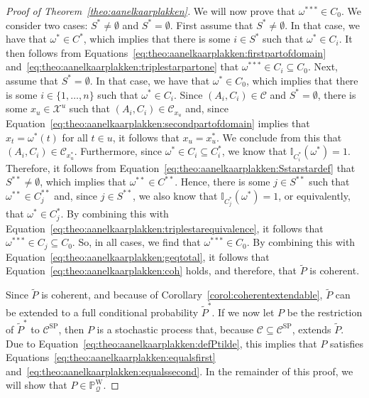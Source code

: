 \documentclass[10pt,a4paper]{paper}
\theoremstyle{definition}
\newcommand{\states}{\mathcal{X}}
\newcommand{\processes}{\mathbb{P}}
\newcommand{\wprocesses}{\processes^{\mathrm{W}}}
\newcommand{\ind}[1]{\mathbb{I}_{#1}}
\newcommand{\rateset}{\mathcal{Q}}
\begin{document}
\begin{proof}[Proof of Theorem~\ref{theo:aanelkaarplakken}]
We will now prove that $\omega^{***}\in C_0$. We consider two cases: $S^*\neq\emptyset$ and $S^*=\emptyset$. First assume that $S^*\neq\emptyset$. In that case, we have that $\omega^*\in C^*$, which implies that there is some $i\in S^*$ such that $\omega^*\in C_i$. It then follows from Equations~\eqref{eq:theo:aanelkaarplakken:firstpartofdomain} and~\eqref{eq:theo:aanelkaarplakken:triplestarpartone} that $\omega^{***}\in C_i\subseteq C_0$. 
Next, assume that $S^*=\emptyset$. In that case, we have that $\omega^*\in C_0$, which implies that there is some $i\in\{1,\dots,n\}$ such that $\omega^*\in C_i$. Since $(A_i,C_i)\in\mathcal{C}$ and $S^*=\emptyset$, there is some $x_u\in\states^u$ such that $(A_i,C_i)\in\mathcal{C}_{x_u}$ and, since Equation~\eqref{eq:theo:aanelkaarplakken:secondpartofdomain} implies that $x_t=\omega^*(t)$ for all $t\in u$, it follows that $x_u=x_u^*$. We conclude from this that $(A_i,C_i)\in\mathcal{C}_{x_u^*}$. Furthermore, since $\omega^*\in C_i\subseteq C_i^*$, we know that $\ind{C_i^*}(\omega^*)=1$. Therefore, it follows from Equation~\eqref{eq:theo:aanelkaarplakken:Sstarstardef} that $S^{**}\neq\emptyset$, which implies that $\omega^{**}\in C^{**}$. Hence, there is some $j\in S^{**}$ such that $\omega^{**}\in C_j^{**}$ and, since $j\in S^{**}$, we also know that $\ind{C_j^*}(\omega^*)=1$, or equivalently, that $\omega^*\in C_j^*$. By combining this with Equation~\eqref{eq:theo:aanelkaarplakken:triplestarequivalence}, it follows that $\omega^{***}\in C_j\subseteq C_0$.
So, in all cases, we find that $\omega^{***}\in C_0$. By combining this with Equation~\eqref{eq:theo:aanelkaarplakken:geqtotal}, it follows that Equation~\eqref{eq:theo:aanelkaarplakken:coh} holds, and therefore, that $\tilde{P}$ is coherent.


Since $\tilde{P}$ is coherent, and because of Corollary~\ref{corol:coherentextendable}, $\tilde{P}$ can be extended to a full conditional probability $\tilde{P}^*$. If we now let $P$ be the restriction of $\tilde{P}^*$ to $\mathcal{C}^\mathrm{SP}$, then $P$ is a stochastic process that, because $\mathcal{C}\subseteq\mathcal{C}^\mathrm{SP}$, extends $\tilde{P}$. Due to Equation~\eqref{eq:theo:aanelkaarplakken:defPtilde}, this implies that $P$ satisfies Equations~\eqref{eq:theo:aanelkaarplakken:equalsfirst} and~\eqref{eq:theo:aanelkaarplakken:equalssecond}. In the remainder of this proof, we will show that $P\in\wprocesses_\rateset$.


\end{proof}
\end{document}
